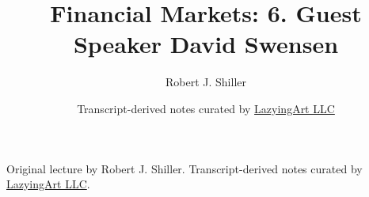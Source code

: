 \documentclass[11pt,oneside]{book}
\begin{document}
\frontmatter
\title{Financial Markets: 6. Guest Speaker David Swensen}
\author{Robert J. Shiller}
\date{Transcript-derived notes curated by \href{https://lazying.art}{LazyingArt LLC}}
\maketitle
\begin{center}
\small Original lecture by Robert J. Shiller. Transcript-derived notes curated by \href{https://lazying.art}{LazyingArt LLC}.
\end{center}
\clearpage
\mainmatter

\end{document}
